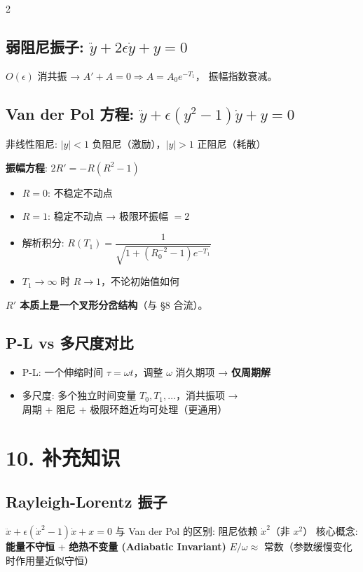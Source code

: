 \documentclass[10pt,a4paper]{article}
\newcommand{\eps}{\epsilon}
\begin{document}
\begin{multicols}{2}
\subsection*{弱阻尼振子: $\ddot{y} + 2\eps\dot{y} + y = 0$}
$O(\eps)$ 消共振 → $A' + A = 0 \Rightarrow A = A_0 e^{-T_1}$，
振幅指数衰减。

\subsection*{Van der Pol 方程: $\ddot{y} + \eps(y^2-1)\dot{y} + y = 0$}
非线性阻尼: $|y|<1$ 负阻尼（激励），$|y|>1$ 正阻尼（耗散）

\textbf{振幅方程}: $2R' = -R(R^2-1)$
\begin{itemize}
\item $R = 0$: 不稳定不动点
\item $R = 1$: 稳定不动点 → 极限环振幅 $= 2$
\item 解析积分: $R(T_1) = \dfrac{1}{\sqrt{1 + (R_0^{-2} - 1)e^{-T_1}}}$
\item $T_1 \to \infty$ 时 $R \to 1$，不论初始值如何
\end{itemize}
\textbf{$R'$ 本质上是一个叉形分岔结构}（与 §8 合流）。

\subsection*{P-L vs 多尺度对比}
\begin{itemize}
\item P-L: 一个伸缩时间 $\tau=\omega t$，调整 $\omega$ 消久期项 → \textbf{仅周期解}
\item 多尺度: 多个独立时间变量 $T_0,T_1,\dots$，消共振项 → \\
  周期 + 阻尼 + 极限环趋近均可处理（更通用）
\end{itemize}


\section{10. 补充知识}

\subsection*{Rayleigh-Lorentz 振子}
$\ddot{x} + \eps(\dot{x}^2 - 1)\dot{x} + x = 0$\;
与 Van der Pol 的区别: 阻尼依赖 $\dot{x}^2$（非 $x^2$）\;
核心概念: \textbf{能量不守恒} + \textbf{绝热不变量 (Adiabatic Invariant)}
$E/\omega \approx$ 常数（参数缓慢变化时作用量近似守恒）


\end{multicols}
\end{document}

